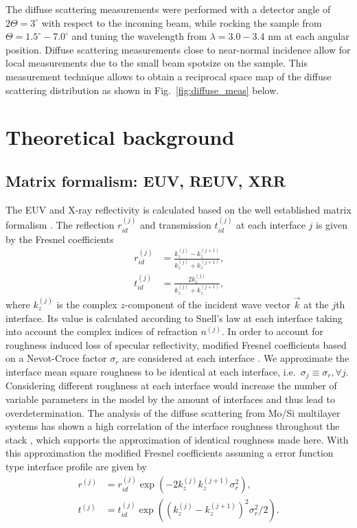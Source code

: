 \documentclass{iucr}              %
\begin{document}
The diffuse scattering measurements were performed with a detector angle of $2\Theta = 3^\circ$ with respect to the incoming beam, while rocking the sample from $\Theta = 1.5^\circ - 7.0^\circ$ and tuning the wavelength from $\lambda = 3.0 - 3.4$ nm at each angular position. Diffuse scattering measurements close to near-normal incidence allow for local measurements due to the small beam spotsize on the sample. This measurement technique allows to obtain a reciprocal space map of the diffuse scattering distribution as shown in Fig.~\ref{fig:diffuse_meas} below.


\section{Theoretical background} \label{sec:matrix_formalism}

\subsection{Matrix formalism: EUV, REUV, XRR} \label{subsec:matrix_formalism}

The EUV and X-ray reflectivity is calculated based on the well established matrix formalism \cite{PrinciplesOfOptics}. The reflection $r_{id}^{(j)}$  and transmission $t_{id}^{(j)}$ at each interface $j$ is given by the Fresnel coefficients
\begin{align}
	r_{id}^{(j)} &= \frac{k_z^{(j)} - k_z^{(j+1)}}{k_z^{(j)} + k_z^{(j+1)}}\text{,} \\
	t_{id}^{(j)} &= \frac{2 k_z^{(j)}}{k_z^{(j)} + k_z^{(j+1)}}\text{,} 
\end{align}
where $k_z^{(j)}$ is the complex $z$-component of the incident wave vector $\vec{k}$ at the $j$th interface. Its value is calculated according to Snell's law at each interface taking into account the complex indices of refraction $n^{(j)}$.
In order to account for roughness induced loss of specular reflectivity, modified Fresnel coefficients based on a Nevot-Croce factor $\sigma_r$ are considered at each interface \cite{nevot_croece}. We approximate the interface mean square roughness to be identical at each interface, i.e.~$\sigma_j \equiv \sigma_r\text{,} \, \forall j$. Considering different roughness at each interface would increase the number of variable parameters in the model by the amount of interfaces and thus lead to overdetermination. The analysis of the diffuse scattering from Mo/Si multilayer systems has shown a high correlation of the interface roughness throughout the stack \cite{Haase:14}, which supports the approximation of identical roughness made here. With this approximation the modified Fresnel coefficients assuming a error function type interface profile are given by
\begin{align}
	r^{(j)} &= r_{id}^{(j)} \exp(-2 k_z^{(j)} k_z^{(j+1)} \sigma_r^2)\text{,} \nonumber \\
	t^{(j)} &= t_{id}^{(j)} \exp((k_z^{(j)} - k_z^{(j+1)})^2 \sigma_r^2/2) \text{.} \label{eqn:modified_fresnel}
\end{align}
\end{document}
